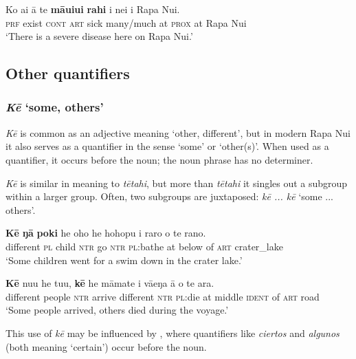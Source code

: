 \ea\label{ex:4.107}
\gll Ko ai {\ꞌ}ā te \textbf{māuiui} \textbf{rahi} {\ꞌ}i nei {\ꞌ}i Rapa Nui. \\
\textsc{prf} exist \textsc{cont} \textsc{art} sick many/much at \textsc{prox} at Rapa Nui \\

\glt 
‘There is a severe disease here on Rapa Nui.’ \textstyleExampleref{[R398.002]} 
\z
{}

\subsection{Other quantifiers}\label{sec:4.4.8}
\subsubsection{\textit{Kē} ‘some, others’}\label{sec:4.4.8.1}
\textit{Kē} is common as an adjective meaning ‘other, different’, but in modern Rapa Nui it also serves as a quantifier in the sense ‘some’ or ‘other(s)’. When used as a quantifier, it occurs before the noun; the noun phrase has no determiner. 

\textit{Kē} is similar in meaning to \textit{tētahi}, but more than \textit{tētahi} it singles out a subgroup within a larger group. Often, two subgroups are juxtaposed: \textit{kē ... kē} ‘some ... others’. 

\ea\label{ex:4.108}
\gll \textbf{Kē} \textbf{ŋā} \textbf{poki} he oho he hohopu {\ꞌ}i raro o te rano. \\
different \textsc{pl} child \textsc{ntr} go \textsc{ntr} \textsc{pl}:bathe at below of \textsc{art} crater\_lake \\

\glt 
‘Some children went for a swim down in the crater lake.’ \textstyleExampleref{[R157.012]} 
\z

\ea\label{ex:4.109}
\gll \textbf{Kē} nu{\ꞌ}u he tu{\ꞌ}u, \textbf{kē} he māmate {\ꞌ}i vāeŋa {\ꞌ}ā o te ara. \\
different people \textsc{ntr} arrive different \textsc{ntr} \textsc{pl}:die at middle \textsc{ident} of \textsc{art} road \\

\glt
‘Some people arrived, others died during the voyage.’ \textstyleExampleref{[R303.002]} 
\z

This use of \textit{kē} may be influenced by , where quantifiers like \textit{ciertos} and \textit{algunos} (both meaning ‘certain’) occur before the noun.

